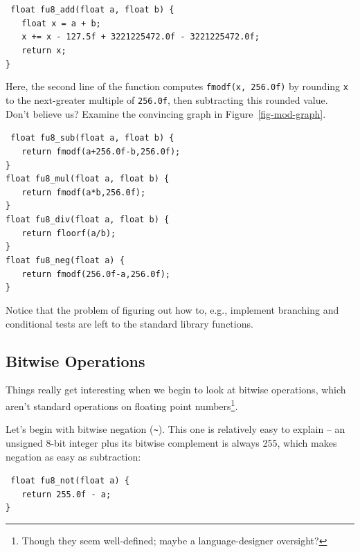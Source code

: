 \documentclass{acmsiggraph}
\theoremstyle{remark}
\theoremstyle{definition}
\begin{document}
{\tt
float fu8\_add(float a, float b) \{ \\
$\phantom{XX}$float x = a + b; \\
$\phantom{XX}$x += x - 127.5f + 3221225472.0f - 3221225472.0f; \\
$\phantom{XX}$return x; \\
\} \\
}

Here, the second line of the function computes {\tt fmodf(x, 256.0f)} by rounding {\tt x} to the next-greater multiple of {\tt 256.0f}, then subtracting this rounded value.
Don't believe us? Examine the convincing graph in Figure~\ref{fig-mod-graph}.

{\tt
float fu8\_sub(float a, float b) \{ \\
$\phantom{XX}$return fmodf(a+256.0f-b,256.0f); \\
\} \\
float fu8\_mul(float a, float b) \{ \\
$\phantom{XX}$return fmodf(a*b,256.0f); \\
\} \\
float fu8\_div(float a, float b) \{ \\
$\phantom{XX}$return floorf(a/b); \\
\} \\
float fu8\_neg(float a) \{ \\
$\phantom{XX}$return fmodf(256.0f-a,256.0f); \\
\}
}

Notice that the problem of figuring out how to, e.g., implement branching and conditional tests are left to the standard library functions.

\subsection{Bitwise Operations}

Things really get interesting when we begin to look at bitwise operations, which aren't standard operations on floating point numbers\footnote{Though they seem well-defined; maybe a language-designer oversight?}.

Let's begin with bitwise negation ({\tt \textasciitilde}).
This one is relatively easy to explain -- an unsigned 8-bit integer plus its bitwise complement is always 255, which makes negation as easy as subtraction:

{\tt
float fu8\_not(float a) \{ \\
$\phantom{XX}$return 255.0f - a; \\
\}
}
\end{document}
